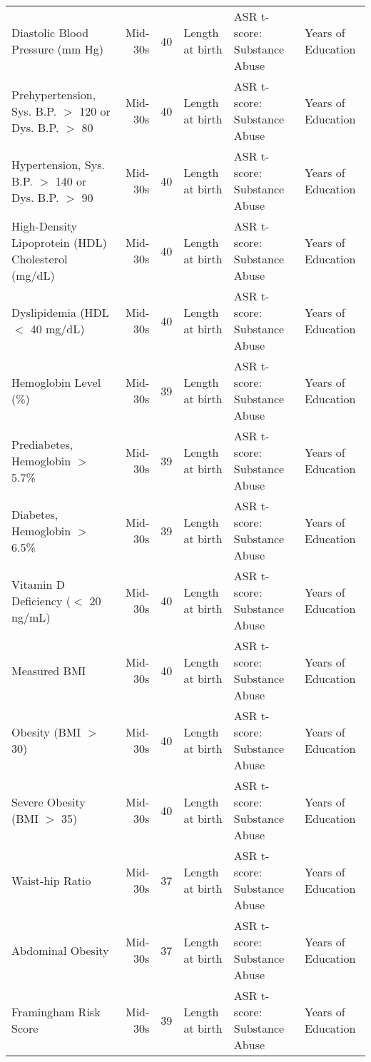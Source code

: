 \begin{tabular}{l r r l l l}
Diastolic Blood Pressure (mm Hg)	&	Mid-30s	&	40	&	Length at birth	&	ASR t-score: Substance Abuse	&	Years of Education	\\
Prehypertension, Sys. B.P. $>$ 120 or Dys. B.P. $>$ 80	&	Mid-30s	&	40	&	Length at birth	&	ASR t-score: Substance Abuse	&	Years of Education	\\
Hypertension, Sys. B.P. $>$ 140 or Dys. B.P. $>$ 90	&	Mid-30s	&	40	&	Length at birth	&	ASR t-score: Substance Abuse	&	Years of Education	\\
High-Density Lipoprotein (HDL) Cholesterol (mg/dL)	&	Mid-30s	&	40	&	Length at birth	&	ASR t-score: Substance Abuse	&	Years of Education	\\
Dyslipidemia (HDL $<$ 40 mg/dL)	&	Mid-30s	&	40	&	Length at birth	&	ASR t-score: Substance Abuse	&	Years of Education	\\
Hemoglobin Level (\%)	&	Mid-30s	&	39	&	Length at birth	&	ASR t-score: Substance Abuse	&	Years of Education	\\
Prediabetes, Hemoglobin $>$ 5.7\%	&	Mid-30s	&	39	&	Length at birth	&	ASR t-score: Substance Abuse	&	Years of Education	\\
Diabetes, Hemoglobin $>$ 6.5\%	&	Mid-30s	&	39	&	Length at birth	&	ASR t-score: Substance Abuse	&	Years of Education	\\
Vitamin D Deficiency ($<$ 20 ng/mL)	&	Mid-30s	&	40	&	Length at birth	&	ASR t-score: Substance Abuse	&	Years of Education	\\
Measured BMI	&	Mid-30s	&	40	&	Length at birth	&	ASR t-score: Substance Abuse	&	Years of Education	\\
Obesity (BMI $>$ 30)	&	Mid-30s	&	40	&	Length at birth	&	ASR t-score: Substance Abuse	&	Years of Education	\\
Severe Obesity (BMI $>$ 35)	&	Mid-30s	&	40	&	Length at birth	&	ASR t-score: Substance Abuse	&	Years of Education	\\
Waist-hip Ratio	&	Mid-30s	&	37	&	Length at birth	&	ASR t-score: Substance Abuse	&	Years of Education	\\
Abdominal Obesity	&	Mid-30s	&	37	&	Length at birth	&	ASR t-score: Substance Abuse	&	Years of Education	\\
Framingham Risk Score	&	Mid-30s	&	39	&	Length at birth	&	ASR t-score: Substance Abuse	&	Years of Education	\\
\bottomrule																																	
\end{tabular}